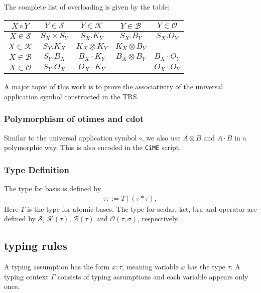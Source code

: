 The complete list of overloading is given by the table:

\begin{center}
  \begin{tabular}{|c|c|c|c|c|}
    \hline
    $X \circ Y$ & $Y \in \mathcal{S}$ & $Y\in \mathcal{K}$ & $Y \in \mathcal{B}$ & $Y \in \mathcal{O}$ \\
    \hline
    $X \in \mathcal{S}$ & $S_X \times S_Y$ & $S_X.K_Y$ & $S_X.B_Y$ & $S_X.O_Y$ \\
    \hline
    $X \in \mathcal{K}$ & $S_Y.K_X$ & $K_X \otimes K_Y$ & $ K_X \otimes B_Y$ &  \\
    \hline
    $X \in \mathcal{B}$ & $S_Y.B_X$ & $B_X \cdot K_Y$ & $B_X \otimes B_Y$ & $B_X \cdot O_Y$ \\
    \hline
    $X \in \mathcal{O}$ & $S_Y.O_X$ & $O_X \cdot K_Y$ &  & $O_X \cdot O_Y$ \\
    \hline
  \end{tabular}
\end{center}


A major topic of this work is to prove the associativity of the universal application symbol constructed in the TRS.

\subsubsection*{Polymorphism of otimes and cdot}
Similar to the universal application symbol $\circ$, we also use $A \otimes B$ and $A \cdot B$ in a polymorphic way. This is also encoded in the \texttt{CiME} script.



\subsubsection*{Type Definition}

\begin{definition}[Types]
  The type for basis is defined by
  \begin{align*}
    \tau ::= T\ |\ (\tau * \tau),
  \end{align*}
  Here $T$ is the type for atomic bases.
  The type for scalar, ket, bra and operator are defined by $\mathcal{S}$, $\mathcal{K}(\tau)$, $\mathcal{B}(\tau)$ and $\mathcal{O}(\tau, \sigma)$, respectively.
\end{definition}

\subsection{typing rules}
  A typing assumption has the form $x : \tau$, meaning variable $x$ has the type $\tau$. A typing context $\Gamma$ consists of typing assumptions and each variable appears only once.

